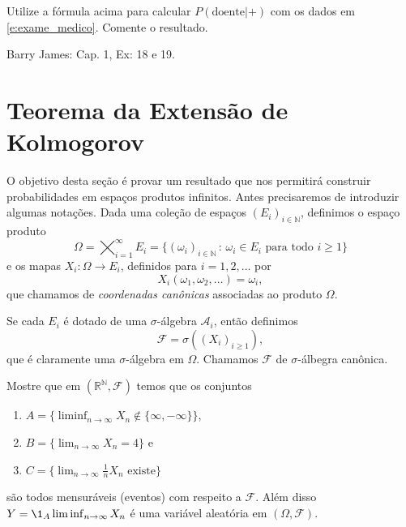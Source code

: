 \begin{exercise}
  Utilize a fórmula acima para calcular $P(\text{doente} | +)$ com os dados em \eqref{e:exame_medico}.
  Comente o resultado.
\end{exercise}

\begin{exercise}
  Barry James: Cap. 1, Ex: 18 e 19.
\end{exercise}




\section{Teorema da Extensão de Kolmogorov}

O objetivo desta seção é provar um resultado que nos permitirá construir probabilidades em espaços produtos infinitos.
Antes precisaremos de introduzir algumas notações.
Dada uma coleção de espaços $(E_i)_{i\in \mathbb{N}}$, definimos o espaço produto
\begin{equation}
  \Omega = \bigtimes_{i=1}^{\infty} E_i = \big\{(\omega_i)_{i\in \mathbb{N}} \, : \,  \omega_i \in E_i \text{ para todo $i \geq 1$}\big\}
\end{equation}
e os mapas $X_i:\Omega \to E_i$, definidos para $i = 1, 2, \dots$ por
\begin{equation}
  X_i(\omega_1, \omega_2, \dots) = \omega_i,
\end{equation}
que chamamos de \emph{coordenadas canônicas}  associadas ao produto $\Omega$.

Se cada $E_i$ é dotado de uma $\sigma$-álgebra $\mathcal{A}_i$, então definimos
\begin{equation}
  \mathcal{F} = \sigma( (X_i)_{i\geq 1} ),
\end{equation}
que é claramente uma $\sigma$-álgebra em $\Omega$.
Chamamos $\mathcal{F}$ de $\sigma$-álbegra canônica.

\begin{exercise}
  Mostre que em $(\mathbb{R}^{\mathbb{N}},\mathcal{F})$ temos que os conjuntos
  \begin{enumerate}[\quad a)]
  \item $A = \{ \liminf_{n\to \infty} X_n \notin \{\infty,-\infty\} \}$,
  \item $B = \{ \lim_{n\to \infty} X_n = 4\}$ e
  \item $C = \{ \lim_{n\to \infty} \tfrac{1}{n} X_n \text{ existe}\}$
  \end{enumerate}
  são todos mensuráveis (eventos) com respeito a $\mathcal{F}$.
  Além disso $Y = \1_A \liminf_{n\to \infty} X_n$ é uma variável aleatória em $(\Omega, \mathcal{F})$.
\end{exercise}

